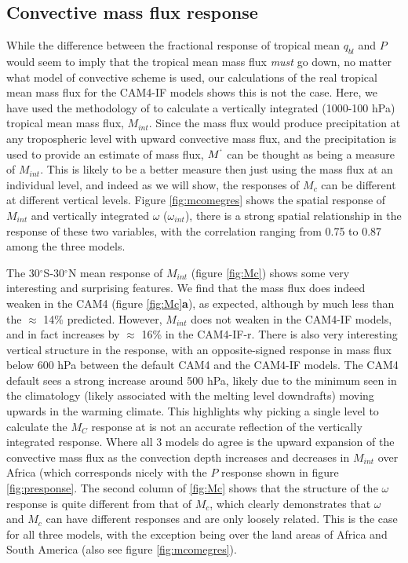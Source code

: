 \documentclass[letterpaper,12pt,titlepage,oneside,final]{book}
\begin{document}
\subsection{Convective mass flux response}
While the difference between the fractional response of tropical mean $q_{bl}$ and $P$ would seem to imply that the tropical mean mass flux \textit{must} go down, no matter what model of convective scheme is used, our calculations of the real tropical mean mass flux for the CAM4-IF models shows this is not the case. Here, we have used the methodology of \citep{chadwick_spatial_2012} to calculate a vertically integrated (1000-100 hPa) tropical mean mass flux, $M_{int}$. Since the mass flux would produce precipitation at any tropospheric level with upward convective mass flux, and the precipitation is used to provide an estimate of mass flux, $M^{`}$ can be thought as being a measure of $M_{int}$. This is likely to be a better measure then just using the mass flux at an individual level, and indeed as we will show, the responses of $M_{c}$ can be different at different vertical levels. Figure \ref{fig:mcomegres} shows the spatial response of $M_{int}$ and vertically integrated $\omega$ ($\omega_{int}$), there is a strong spatial relationship in the response of these two variables, with the correlation ranging from 0.75 to 0.87 among the three models.

The 30$^{\circ}$S-30$^{\circ}$N mean response of $M_{int}$ (figure \ref{fig:Mc}) shows some very interesting and surprising features. We find that the mass flux does indeed weaken in the CAM4 (figure \ref{fig:Mc}\textbf{a}), as expected, although by much less than the $\approx$ 14\% predicted. However, $M_{int}$ does not weaken in the CAM4-IF models, and in fact increases by $\approx$ 16\% in the CAM4-IF-r. There is also very interesting vertical structure in the response, with an opposite-signed response in mass flux below 600 hPa between the default CAM4 and the CAM4-IF models. The CAM4 default sees a strong increase around 500 hPa, likely due to the minimum seen in the climatology (likely associated with the melting level downdrafts) moving upwards in the warming climate. This highlights why picking a single level to calculate the $M_{C}$ response at is not an accurate reflection of the vertically integrated response. Where all 3 models do agree is the upward expansion of the convective mass flux as the convection depth increases and decreases in $M_{int}$ over Africa (which corresponds nicely with the $P$ response shown in figure \ref{fig:presponse}. The second column of \ref{fig:Mc} shows that the structure of the $\omega$ response is quite different from that of $M_{c}$, which clearly demonstrates that $\omega$ and $M_{c}$ can have different responses and are only loosely related. This is the case for all three models, with the exception being over the land areas of Africa and South America (also see figure \ref{fig:mcomegres}).
\end{document}

